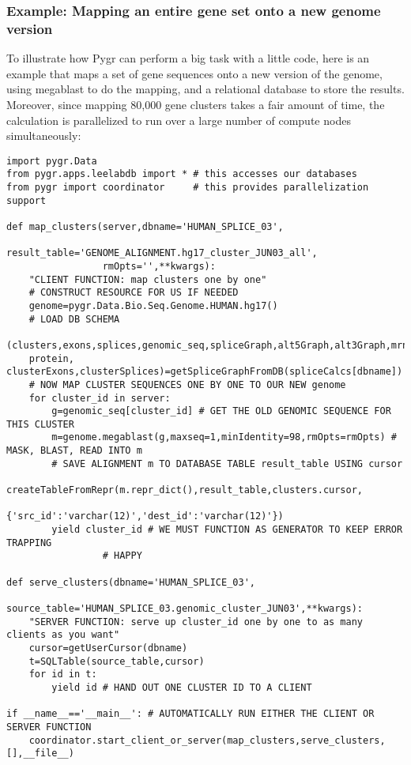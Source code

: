 \documentclass{howto}
\begin{document}
\subsubsection{Example: Mapping an entire gene set onto a new genome version}
To illustrate how Pygr can perform a big task with a little code, here is an example that maps a set of gene sequences onto a new version of the genome, using megablast to do the mapping, and a relational database to store the results.  Moreover, since mapping 80,000 gene clusters takes a fair amount of time, the calculation is parallelized to run over a large number of compute nodes simultaneously:

\begin{verbatim}
import pygr.Data
from pygr.apps.leelabdb import * # this accesses our databases
from pygr import coordinator     # this provides parallelization support

def map_clusters(server,dbname='HUMAN_SPLICE_03',
                 result_table='GENOME_ALIGNMENT.hg17_cluster_JUN03_all',
                 rmOpts='',**kwargs):
    "CLIENT FUNCTION: map clusters one by one"
    # CONSTRUCT RESOURCE FOR US IF NEEDED
    genome=pygr.Data.Bio.Seq.Genome.HUMAN.hg17()
    # LOAD DB SCHEMA
    (clusters,exons,splices,genomic_seq,spliceGraph,alt5Graph,alt3Graph,mrna, 
    protein, clusterExons,clusterSplices)=getSpliceGraphFromDB(spliceCalcs[dbname])
    # NOW MAP CLUSTER SEQUENCES ONE BY ONE TO OUR NEW genome
    for cluster_id in server:
        g=genomic_seq[cluster_id] # GET THE OLD GENOMIC SEQUENCE FOR THIS CLUSTER
        m=genome.megablast(g,maxseq=1,minIdentity=98,rmOpts=rmOpts) # MASK, BLAST, READ INTO m
        # SAVE ALIGNMENT m TO DATABASE TABLE result_table USING cursor
        createTableFromRepr(m.repr_dict(),result_table,clusters.cursor,
                            {'src_id':'varchar(12)','dest_id':'varchar(12)'})
        yield cluster_id # WE MUST FUNCTION AS GENERATOR TO KEEP ERROR TRAPPING 
		         # HAPPY

def serve_clusters(dbname='HUMAN_SPLICE_03',
                   source_table='HUMAN_SPLICE_03.genomic_cluster_JUN03',**kwargs):
    "SERVER FUNCTION: serve up cluster_id one by one to as many clients as you want"
    cursor=getUserCursor(dbname)
    t=SQLTable(source_table,cursor)
    for id in t:
        yield id # HAND OUT ONE CLUSTER ID TO A CLIENT

if __name__=='__main__': # AUTOMATICALLY RUN EITHER THE CLIENT OR SERVER FUNCTION
    coordinator.start_client_or_server(map_clusters,serve_clusters,[],__file__)
\end{verbatim}
\end{document}
